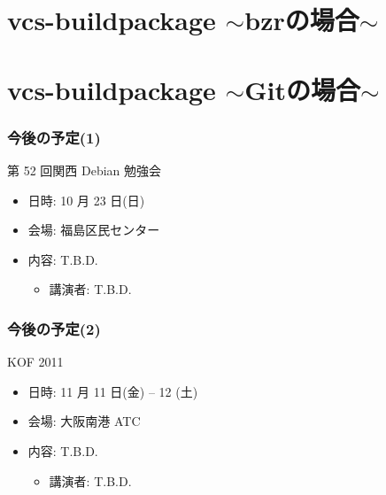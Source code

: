 \documentclass[cjk,dvipdfmx,12pt,%
hyperref={bookmarks=true,bookmarksnumbered=true,bookmarksopen=false,%
colorlinks=false,%
pdftitle={第 51 回 関西 Debian 勉強会},%
pdfauthor={倉敷・のがた・佐々木},%
pdfsubject={資料},%
}]{beamer}
\begin{document}
\section{vcs-buildpackage $\sim$bzrの場合$\sim$}


\section{vcs-buildpackage $\sim$Gitの場合$\sim$}



\begin{frame}[fragile]
\frametitle{今後の予定(1)}

\begin{block}{第 52 回関西 Debian 勉強会}
  \begin{itemize}
  \item 日時: 10 月 23 日(日)
  \item 会場: 福島区民センター
  \item 内容: T.B.D.
    \begin{itemize}
    \item 講演者: T.B.D.
    \end{itemize}
  \end{itemize}
\end{block}

\end{frame}

\begin{frame}[fragile]
\frametitle{今後の予定(2)}

\begin{block}{KOF 2011}
  \begin{itemize}
  \item 日時: 11 月 11 日(金) -- 12 (土)
  \item 会場: 大阪南港 ATC
  \item 内容: T.B.D.
    \begin{itemize}
    \item 講演者: T.B.D.
    \end{itemize}
  \end{itemize}
\end{block}

\end{frame}


\takahashi[50]{  }
\end{document}

